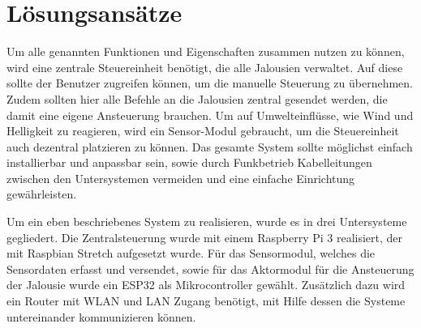 \section{Lösungsansätze}
Um alle genannten Funktionen und Eigenschaften zusammen nutzen zu können, wird eine zentrale Steuereinheit benötigt, die alle Jalousien verwaltet. Auf diese sollte der Benutzer zugreifen können, um die manuelle Steuerung zu übernehmen. Zudem sollten hier alle Befehle an die Jalousien zentral gesendet werden, die damit eine eigene Ansteuerung brauchen. Um auf Umwelteinflüsse, wie Wind und Helligkeit zu reagieren, wird ein Sensor-Modul gebraucht, um die Steuereinheit auch dezentral platzieren zu können. Das gesamte System sollte möglichst einfach installierbar und anpassbar sein, sowie durch Funkbetrieb Kabelleitungen zwischen den Untersystemen vermeiden und eine einfache Einrichtung gewährleisten.

Um ein eben beschriebenes System zu realisieren, wurde es in drei Untersysteme gegliedert. Die Zentralsteuerung wurde mit einem Raspberry Pi 3 realisiert, der mit Raspbian Stretch aufgesetzt wurde. Für das Sensormodul, welches die Sensordaten erfasst und versendet, sowie für das Aktormodul für die Ansteuerung der Jalousie wurde ein ESP32 als Mikrocontroller gewählt. Zusätzlich dazu wird ein Router mit WLAN und LAN Zugang benötigt, mit Hilfe dessen die Systeme untereinander kommunizieren können.